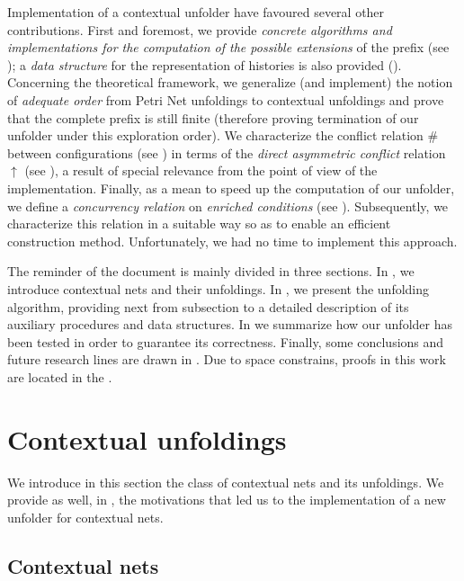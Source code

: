 \documentclass[11pt,a4paper]{article}
\newcommand{\confl}{\ensuremath{\mathord{\#}}}
\begin{document}
Implementation of a contextual unfolder have favoured several other
contributions.  First and foremost, we provide \emph{concrete algorithms and
implementations for the computation of the possible extensions} of the prefix
(see ); a \emph{data structure} for the
representation of histories is also provided ().
Concerning the theoretical framework, we generalize (and implement) the notion
of \emph{adequate order}  from Petri Net unfoldings to contextual
unfoldings and prove that the complete prefix is still finite (therefore
proving termination of our unfolder under this exploration order).  We
characterize the conflict relation $\confl$ between configurations (see
) in terms of the \emph{direct asymmetric conflict} relation
$\uparrow$ (see ), a result of special relevance from
the point of view of the implementation.  Finally, as a mean to speed up the
computation of our unfolder, we define a \emph{concurrency relation} on
\emph{enriched conditions} (see ).  Subsequently, we
characterize this relation in a suitable way so as to enable an efficient
construction method.  Unfortunately, we had no time to implement this approach.

The reminder of the document is mainly divided in three sections.  In
, we introduce contextual nets and their
unfoldings.  In , we present the unfolding algorithm,
providing next from subsection  to
 a detailed description of its auxiliary procedures and
data structures. In  we summarize how our unfolder has
been tested in order to guarantee its correctness.  Finally, some conclusions
and future research lines are drawn in .  Due to space
constrains, proofs in this work are located in the .

\section{Contextual unfoldings}
\label{sec:contextual.unfoldings}

We introduce in this section the class of contextual nets and its unfoldings.
We provide as well, in , the motivations that led us
to the implementation of a new unfolder for contextual nets.

\subsection{Contextual nets}
\label{sec:contextual.nets}
\end{document}
